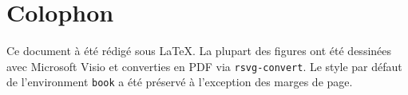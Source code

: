 \section{Colophon}

Ce document à été rédigé sous \LaTeX. La plupart des figures ont été dessinées avec Microsoft Visio et converties en PDF via \texttt{rsvg-convert}. Le style par défaut de l'environment \texttt{book} a été préservé à l'exception des marges de page.